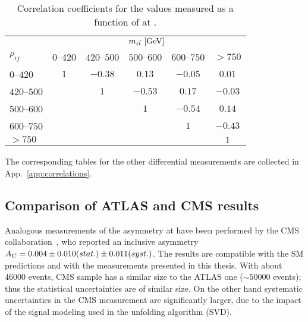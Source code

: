 \begin{table}[!htp]\centering
\begin{tabular}{l c c c c c }
  \toprule
  &\multicolumn{5}{c}{$m_{t\bar{t}}{}~[\rm{GeV}]$}    \\
  $\rho_{ij}$ & $0$--$420$ & $420$--$500$ & $500$--$600$ & $600$--$750$ & $>750$ \\
  \midrule
  $0$--$420$      & $1$ & $-0.38$ & $0.13$  & $-0.05$ & $0.01$  \\
  $420$--$500$    &     & $1$     & $-0.53$ & $0.17$  & $-0.03$ \\
  $500$--$600$    &     &         & $1$     & $-0.54$ & $0.14$  \\
  $600$--$750$    &     &         &         & $1$     & $-0.43$ \\
  $>750$          &     &         &         &         & $1$     \\
  \bottomrule
\end{tabular}
\caption{Correlation coefficients for the \ac{} values measured as a
  function of \mtt{} at \seventev{}.} 
\label{tab:corr_mtt}
\end{table}
The corresponding tables for the other differential measurements are
collected in App.~\ref{app:correlations}.

\subsection{Comparison of ATLAS and CMS results}

Analogous measurements of the asymmetry \ac{} at \seventev{} have been
performed by the CMS collaboration~\cite{Chatrchyan:2012cxa}, who
reported an inclusive asymmetry
$A_C{}=0.004\pm0.010(stat.)\pm0.011(syst.)$.
The results are compatible with the SM predictions and with the
measurements presented in this thesis. 
With about 46000 \ttbar{} events, CMS sample has a similar size to the
ATLAS one ($\sim50000$ events); thus the statistical uncertainties are
of similar size. On the other hand systematic uncertainties in the CMS
measurement are significantly larger, due to the impact of the signal
modeling used in the unfolding algorithm (SVD).

